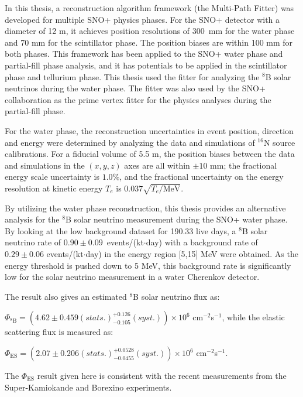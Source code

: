 In this thesis, a reconstruction algorithm framework (the Multi-Path Fitter) was developed for multiple SNO+ physics phases. For the SNO+ detector with a diameter of 12 m, it achieves position resolutions of 300~mm for the water phase and 70 mm for the scintillator phase. The position biases are within 100 mm for both phases. This framework has been applied to the SNO+ water phase and partial-fill phase analysis, and it has potentials to be applied in the scintillator phase and tellurium phase. This thesis used the fitter for analyzing the $^8$B solar neutrinos during the water phase. The fitter was also used by the SNO+ collaboration as the prime vertex fitter for the physics analyses during the partial-fill phase.

For the water phase, the reconstruction uncertainties in event position, direction and energy were determined by analyzing the data and simulations of $^{16}$N source calibrations. For a fiducial volume of 5.5 m, the position biases between the data and simulations in the $(x,y,z)$ axes are all within $\pm10$ mm; the fractional energy scale uncertainty is $1.0$\%, and the fractional uncertainty on the energy resolution at kinetic energy $T_e$ is $0.037\sqrt{T_e/\mathrm{MeV}}$.

By utilizing the water phase reconstruction, this thesis provides an alternative analysis for the $^8$B solar neutrino measurement during the SNO+ water phase. By looking at the low background dataset for 190.33 live days, a $^8$B solar neutrino rate of $0.90\pm0.09$~events/(kt$\cdot$day) with a background rate of $0.29\pm 0.06$ events/(kt$\cdot$day) in the energy region [5,15] MeV were obtained. As the energy threshold is pushed down to 5 MeV, this background rate is significantly low for the solar neutrino measurement in a water Cherenkov detector.

The result also gives an estimated $^8$B solar neutrino flux as: 

$\Phi_{\mathrm{^8B}}=(4.62 \pm 0.459 (stats.)^{+0.126}_{-0.105}(syst.))\times10^6$ cm$^{-2}$s$^{-1}$, 
while the elastic scattering flux is measured as: 

$\Phi_{\mathrm{ES}}=(2.07 \pm 0.206(stats.)^{+0.0528}_{-0.0455}(syst.))\times10^6$ cm$^{-2}$s$^{-1}$.

The $\Phi_{\mathrm{ES}}$ result given here is consistent with the recent measurements from the Super-Kamiokande and Borexino experiments.